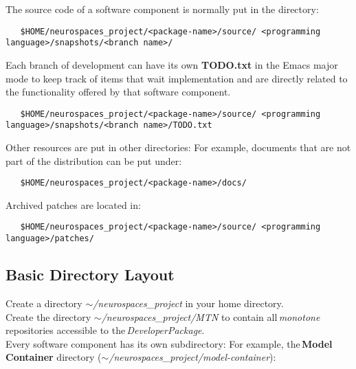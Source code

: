 \documentclass[12pt]{article}
\begin{document}
The source code of a software component is normally put in the directory:
\begin{verbatim}
   $HOME/neurospaces_project/<package-name>/source/ <programming language>/snapshots/<branch name>/
\end{verbatim}
Each branch of development can have its own {\bf TODO.txt} in the
Emacs major mode to keep track of items that wait implementation and
are directly related to the functionality offered by that software
component.
\begin{verbatim}
   $HOME/neurospaces_project/<package-name>/source/ <programming language>/snapshots/<branch name>/TODO.txt
\end{verbatim}
Other resources are put in other directories: For example, documents that are not part of the distribution can be put under:
\begin{verbatim}
   $HOME/neurospaces_project/<package-name>/docs/
\end{verbatim}
Archived patches are located in:
\begin{verbatim}
   $HOME/neurospaces_project/<package-name>/source/ <programming language>/patches/ 
\end{verbatim}


\subsection*{Basic Directory Layout}

Create a directory {\it $\sim$/neurospaces\_project} in your home directory. \\
\noindent Create the directory {\it $\sim$/neurospaces\_project/MTN} to contain all\,{\it monotone} repositories accessible to the\,{\it DeveloperPackage}. \\
\noindent Every software component has its own subdirectory: For example, the\,{\bf Model\,Container} directory ({\it $\sim$/neurospaces\_project/model-container}):
\end{document}
